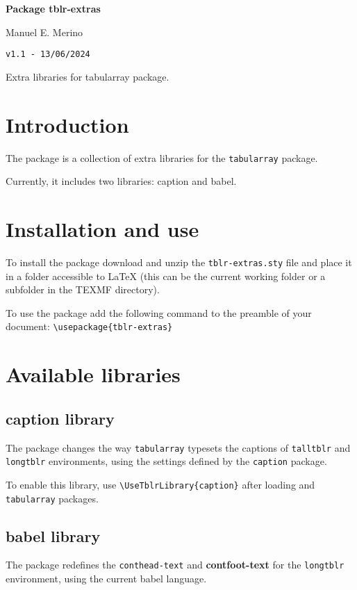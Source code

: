\documentclass[a4paper,12pt]{article}
\newcommand{\Version}{1.1}
\begin{document}
	\begingroup%
	\centering
	\LARGE\textbf{Package \color{udep}tblr-extras}\par
	\large Manuel E. Merino\par
	\texttt{v\Version{} - 13/06/2024}\par
	\normalsize Extra libraries for tabularray package.\par
	\endgroup
	\tableofcontents
	\clearpage

	\section{Introduction}
	The \tblrextras{} package is a collection of extra libraries for the \texttt{tabularray} package.

	Currently, it includes two libraries: caption and babel.

	\section{Installation and use}

	To install the \tblrextras{} package download and unzip the \texttt{tblr-extras.sty} file and place it in a folder accessible to \LaTeX{} (this can be the current working folder or a subfolder in the TEXMF directory).

	To use the \tblrextras{} package add the following command to the preamble of your document: \verb|\usepackage{tblr-extras}|

	\section{Available libraries}
	\subsection{caption library}

	The \tblrextras{} package changes the way \texttt{tabularray} typesets the captions of \texttt{talltblr} and \texttt{longtblr} environments, using the settings defined by the \texttt{caption} package.

	To enable this library, use \verb*|\UseTblrLibrary{caption}| after loading \tblrextras{} and \texttt{tabularray} packages.

	\subsection{babel library}

	The \tblrextras{} package redefines the \texttt{conthead-text} and \textbf{contfoot-text} for the \texttt{longtblr} environment, using the current babel language.
\end{document}
